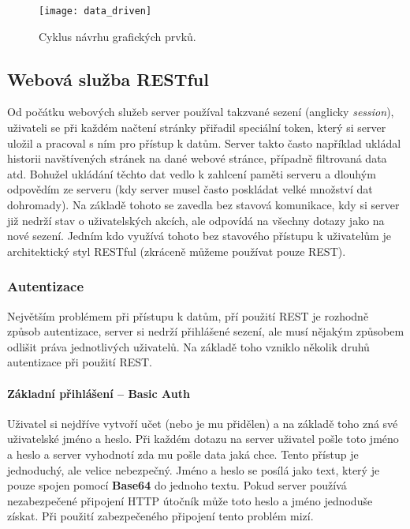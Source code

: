\begin{figure}[h]
\centering
\texttt{[image: data\_driven]}
\caption{Cyklus návrhu grafických prvků.}
\label{data-cycle}
\end{figure}

\subsection{Webová služba RESTful}
\par Od počátku webových služeb server používal takzvané sezení (anglicky \textit{session}), uživateli se při každém načtení stránky přiřadil speciální token, který si server uložil a pracoval s ním pro přístup k datům. Server takto často například ukládal historii navštívených stránek na dané webové stránce, případně filtrovaná data atd. Bohužel ukládání těchto dat vedlo k zahlcení paměti serveru a dlouhým odpovědím ze serveru (kdy server musel často poskládat velké množství dat dohromady). Na základě tohoto se zavedla bez stavová komunikace, kdy si server již nedrží stav o uživatelských akcích, ale odpovídá na všechny dotazy jako na nové sezení. Jedním kdo využívá tohoto bez stavového přístupu k uživatelům je architektický styl RESTful (zkráceně můžeme používat pouze REST). \cite{rest-cookbook}

\subsubsection{Autentizace}
Největším problémem při přístupu k datům, pří použití REST je rozhodně způsob autentizace, server si nedrží přihlášené sezení, ale musí nějakým způsobem odlišit práva jednotlivých uživatelů. Na základě toho vzniklo několik druhů autentizace při použití REST. \cite{rest-cookbook}

\paragraph{Základní přihlášení -- Basic Auth} Uživatel si nejdříve vytvoří učet (nebo je mu přidělen) a na základě toho zná své uživatelské jméno a heslo. Při každém dotazu na server uživatel pošle toto jméno a heslo a server vyhodnotí zda mu pošle data jaká chce. Tento přístup je jednoduchý, ale velice nebezpečný. Jméno a heslo se posílá jako text, který je pouze spojen pomocí \textbf{Base64} do jednoho textu. Pokud server používá nezabezpečené připojení HTTP útočník může toto heslo a jméno jednoduše získat. Při použití zabezpečeného připojení tento problém mizí. \cite{rest-cookbook}

